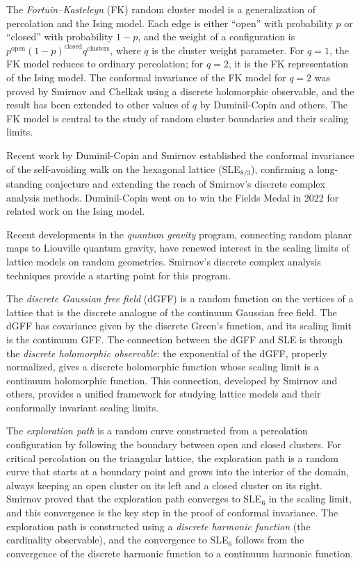 The \emph{Fortuin--Kasteleyn} (FK) random cluster model is a generalization of percolation and the Ising model. Each edge is either ``open'' with probability $p$ or ``closed'' with probability $1-p$, and the weight of a configuration is $p^{\text{open}} (1-p)^{\text{closed}} q^{\text{clusters}}$, where $q$ is the cluster weight parameter. For $q=1$, the FK model reduces to ordinary percolation; for $q=2$, it is the FK representation of the Ising model. The conformal invariance of the FK model for $q=2$ was proved by Smirnov and Chelkak using a discrete holomorphic observable, and the result has been extended to other values of $q$ by Duminil-Copin and others. The FK model is central to the study of random cluster boundaries and their scaling limits.

Recent work by Duminil-Copin and Smirnov established the conformal invariance of the self-avoiding walk on the hexagonal lattice (SLE$_{8/3}$), confirming a long-standing conjecture and extending the reach of Smirnov's discrete complex analysis methods. Duminil-Copin went on to win the Fields Medal in 2022 for related work on the Ising model.

Recent developments in the \emph{quantum gravity} program, connecting random planar maps to Liouville quantum gravity, have renewed interest in the scaling limits of lattice models on random geometries. Smirnov's discrete complex analysis techniques provide a starting point for this program.

The \emph{discrete Gaussian free field} (dGFF) is a random function on the vertices of a lattice that is the discrete analogue of the continuum Gaussian free field. The dGFF has covariance given by the discrete Green's function, and its scaling limit is the continuum GFF. The connection between the dGFF and SLE is through the \emph{discrete holomorphic observable}: the exponential of the dGFF, properly normalized, gives a discrete holomorphic function whose scaling limit is a continuum holomorphic function. This connection, developed by Smirnov and others, provides a unified framework for studying lattice models and their conformally invariant scaling limits.

The \emph{exploration path} is a random curve constructed from a percolation configuration by following the boundary between open and closed clusters. For critical percolation on the triangular lattice, the exploration path is a random curve that starts at a boundary point and grows into the interior of the domain, always keeping an open cluster on its left and a closed cluster on its right. Smirnov proved that the exploration path converges to SLE$_6$ in the scaling limit, and this convergence is the key step in the proof of conformal invariance. The exploration path is constructed using a \emph{discrete harmonic function} (the cardinality observable), and the convergence to SLE$_6$ follows from the convergence of the discrete harmonic function to a continuum harmonic function.

